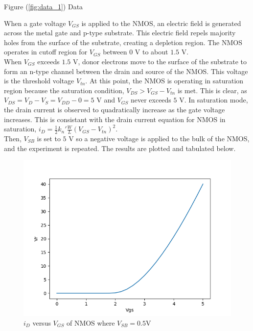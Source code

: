 \FloatBarrier

\begin{table}[h!]
	\centering
	\caption{Figure (\ref{fig:data_1}) Data}
	\label{tab:data_1}
\end{table}

\FloatBarrier

When a gate voltage $V_{GS}$ is applied to the NMOS, an electric field is generated across the metal gate and p-type substrate. 
This electric field repels majority holes from the surface of the substrate, creating a depletion region. 
The NMOS operates in cutoff region for $V_{GS}$ between $0$ \si{\volt} to about $1.5$ \si{\volt}. \\

When $V_{GS}$ exceeds $1.5$ \si{\volt}, donor electrons move to the surface of the substrate to form an n-type channel between the drain and source of the NMOS. 
This voltage is the threshold voltage $V_{tn}$. 
At this point, the NMOS is operating in saturation region because the saturation condition, $V_{DS} > V_{GS} - V_{tn}$ is met.
This is clear, as $V_{DS} = V_D - V_S = V_{DD} - 0 = 5$ \si{\volt} and $V_{GS}$ never exceeds $5$ \si{\volt}.
In saturation mode, the drain current is observed to quadratically increase as the gate voltage increases.
This is consistant with the drain current equation for NMOS in saturation, $i_D = \frac{1}{2}k_n' \frac{W}{L} (V_{GS} - V_{tn})^2$. \\

Then, $V_{SB}$ is set to $5$ \si{\volt} so a negative voltage is applied to the bulk of the NMOS, and the experiment is repeated.
The results are plotted and tabulated below. \\

\FloatBarrier

\begin{figure}[h!]
	\centering
	\includegraphics[scale=0.75]{./images/data_1_lower_body.PNG}
	\caption{$i_{D}$ versus $V_{GS}$ of NMOS where $V_{SB}= 0.5$\si{\volt}}
	\label{fig:data_1_b}
\end{figure}

